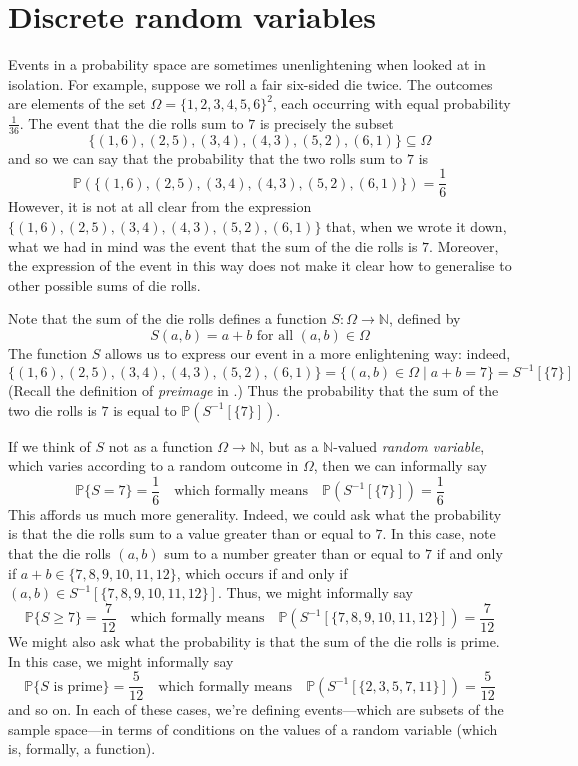 \section{Discrete random variables}

Events in a probability space are sometimes unenlightening when looked at in isolation. For example, suppose we roll a fair six-sided die twice. The outcomes are elements of the set $\Omega = \{ 1, 2, 3, 4, 5, 6 \}^2$, each occurring with equal probability $\frac{1}{36}$. The event that the die rolls sum to $7$ is precisely the subset
\[ \{ (1,6), (2,5), (3,4), (4,3), (5,2), (6,1) \} \subseteq \Omega \]
and so we can say that the probability that the two rolls sum to $7$ is
\[ \mathbb{P}( \{ (1,6), (2,5), (3,4), (4,3), (5,2), (6,1) \}) = \frac{1}{6} \]
However, it is not at all clear from the expression $\{ (1,6), (2,5), (3,4), (4,3), (5,2), (6,1) \}$ that, when we wrote it down, what we had in mind was the event that the sum of the die rolls is $7$. Moreover, the expression of the event in this way does not make it clear how to generalise to other possible sums of die rolls.

Note that the sum of the die rolls defines a function $S : \Omega \to \mathbb{N}$, defined by
\[ S(a,b) = a+b \text{ for all } (a,b) \in \Omega \]
The function $S$ allows us to express our event in a more enlightening way: indeed,
\[ \{ (1,6), (2,5), (3,4), (4,3), (5,2), (6,1) \} = \{ (a,b) \in \Omega \mid a+b=7 \} = S^{-1}[\{7\}] \]
(Recall the definition of \textit{preimage} in .) Thus the probability that the sum of the two die rolls is $7$ is equal to $\mathbb{P}(S^{-1}[\{7\}])$.

If we think of $S$ not as a function $\Omega \to \mathbb{N}$, but as a $\mathbb{N}$-valued \textit{random variable}, which varies according to a random outcome in $\Omega$, then we can informally say
\[ \mathbb{P}\{S = 7\} = \frac{1}{6} \quad \text{which formally means} \quad \mathbb{P}(S^{-1}[\{7\}]) = \frac{1}{6} \]
This affords us much more generality. Indeed, we could ask what the probability is that the die rolls sum to a value greater than or equal to $7$. In this case, note that the die rolls $(a,b)$ sum to a number greater than or equal to $7$ if and only if $a+b \in \{7,8,9,10,11,12\}$, which occurs if and only if $(a,b) \in S^{-1}[\{7,8,9,10,11,12\}]$. Thus, we might informally say
\[ \mathbb{P}\{S \ge 7\} = \frac{7}{12} \quad \text{which formally means} \quad \mathbb{P}(S^{-1}[\{7,8,9,10,11,12\}]) = \frac{7}{12} \]
We might also ask what the probability is that the sum of the die rolls is prime. In this case, we might informally say
\[ \mathbb{P}\{S \text{ is prime}\} = \frac{5}{12} \quad \text{which formally means} \quad \mathbb{P}(S^{-1}[\{2,3,5,7,11\}])  = \frac{5}{12} \]
and so on. In each of these cases, we're defining events---which are subsets of the sample space---in terms of conditions on the values of a random variable (which is, formally, a function).

